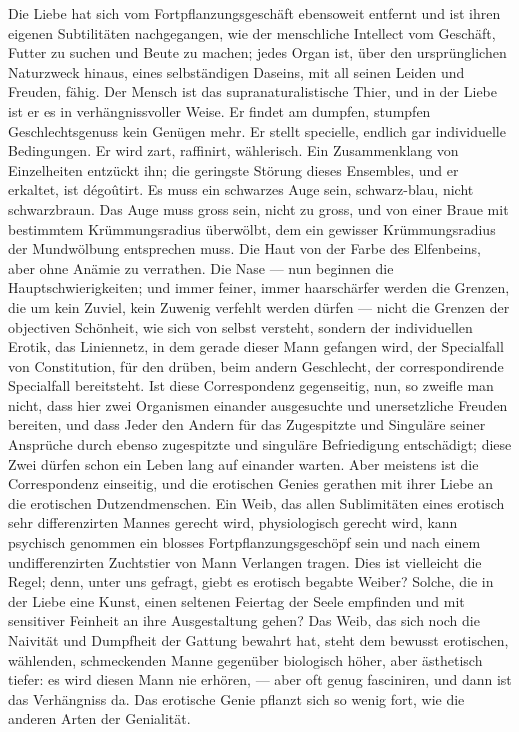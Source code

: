 Die Liebe hat sich vom Fortpflanzungsgeschäft ebensoweit entfernt und ist ihren eigenen Subtilitäten nachgegangen, wie der menschliche Intellect vom Geschäft, Futter zu suchen und Beute zu machen; jedes Organ ist, über den ursprünglichen Naturzweck hinaus, eines selbständigen Daseins, mit all seinen Leiden und Freuden, fähig. Der Mensch ist das supranaturalistische Thier, und in der Liebe ist er es in verhängnissvoller Weise. Er findet am dumpfen, stumpfen Geschlechtsgenuss kein Genügen mehr. Er stellt specielle, endlich gar individuelle Bedingungen. Er wird zart, raffinirt, wählerisch. Ein Zusammenklang von Einzelheiten entzückt ihn; die geringste Störung dieses Ensembles, und er erkaltet, ist dégoûtirt. Es muss ein schwarzes Auge sein, schwarz-blau, nicht schwarzbraun. Das Auge muss gross sein, nicht zu gross, und von einer Braue mit bestimmtem Krümmungsradius überwölbt, dem ein gewisser Krümmungsradius der Mundwölbung entsprechen muss. Die Haut von der Farbe des Elfenbeins, aber ohne Anämie zu verrathen. Die Nase — nun beginnen die Hauptschwierigkeiten; und immer feiner, immer haarschärfer werden die Grenzen, die um kein Zuviel, kein Zuwenig verfehlt werden dürfen — nicht die Grenzen der objectiven Schönheit, wie sich von selbst versteht, sondern der individuellen Erotik, das Liniennetz, in dem gerade dieser Mann gefangen wird, der Specialfall von Constitution, für den drüben, beim andern Geschlecht, der correspondirende Specialfall bereitsteht. Ist diese Correspondenz gegenseitig, nun, so zweifle man nicht, dass hier zwei Organismen einander ausgesuchte und unersetzliche Freuden bereiten, und dass Jeder den Andern für das Zugespitzte und Singuläre seiner Ansprüche durch ebenso zugespitzte und singuläre Befriedigung entschädigt; diese Zwei dürfen schon ein Leben lang auf einander warten. Aber meistens ist die Correspondenz einseitig, und die erotischen Genies gerathen mit ihrer Liebe an die erotischen Dutzendmenschen. Ein Weib, das allen Sublimitäten eines erotisch sehr differenzirten Mannes gerecht wird, physiologisch gerecht wird, kann psychisch genommen ein blosses Fortpflanzungsgeschöpf sein und nach einem undifferenzirten Zuchtstier von Mann Verlangen tragen. Dies ist vielleicht die Regel; denn, unter uns gefragt, giebt es erotisch begabte Weiber? Solche, die in der Liebe eine Kunst, einen seltenen Feiertag der Seele empfinden und mit sensitiver Feinheit an ihre Ausgestaltung gehen? Das Weib, das sich noch die Naivität und Dumpfheit der Gattung bewahrt hat, steht dem bewusst erotischen, wählenden, schmeckenden Manne gegenüber biologisch höher, aber ästhetisch tiefer: es wird diesen Mann nie erhören, — aber oft genug fasciniren, und dann ist das Verhängniss da. Das erotische Genie pflanzt sich so wenig fort, wie die anderen Arten der Genialität.
\par

